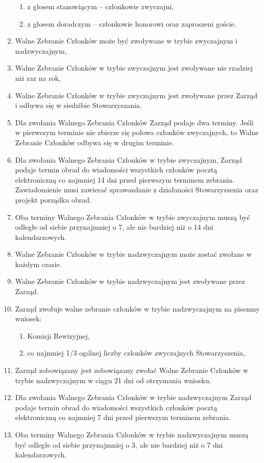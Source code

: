 \documentclass{article}
\begin{document}
\begin{enumerate}
\begin{enumerate}
	            \item z głosem stanowiącym – członkowie zwyczajni,
	            \item z głosem doradczym – członkowie honorowi oraz zaproszeni goście.
	          \end{enumerate}
	        \item Walne Zebranie Członków może być zwoływane w trybie zwyczajnym i nadzwyczajnym,
	        \item Walne Zebranie Członków w trybie zwyczajnym jest zwoływane nie rzadziej niż raz na rok,
	        \item Walne Zebranie Członków w trybie zwyczajnym jest zwoływane przez Zarząd i odbywa się w siedzibie Stowarzyszania.
	    \item Dla zwołania Walnego Zebrania Członków Zarząd podaje dwa terminy. Jeśli w pierwszym terminie nie zbierze się połowa członków zwyczajnych, to Walne Zebranie Członków odbywa się w drugim terminie.
	    \item Dla zwołania Walnego Zebrania Członków w trybie zwyczajnym, Zarząd podaje termin obrad do wiadomości wszystkich członków pocztą elektroniczną co najmniej 14 dni przed pierwszym terminem zebrania. Zawiadomienie musi zawierać sprawozdanie z działaności Stowarzyszenia oraz projekt porządku obrad.
	    \item Oba terminy Walnego Zebrania Członków w trybie zwyczajnym muszą być odległe od siebie przynajmniej o 7, ale nie bardziej niż o 14 dni kalendarzowych.
	    \item Walne Zebranie Członków w trybie nadzwyczajnym może zostać zwołane w każdym czasie.
	    \item Walne Zebranie Członków w trybie nadzwyczajnym jest zwoływane przez Zarząd.
	    \item Zarząd zwołuje walne zebranie członków w trybie nadzwyczajnym na pisemny wniosek:
	      \begin{enumerate}
	        \item Komisji Rewizyjnej,
	        \item co najmniej 1/3 ogólnej liczby członków zwyczajnych Stowarzyszenia,
	        \end{enumerate}
	    \item Zarząd zobowiązany jest zobowiązany zwołać Walne Zebranie Członków w trybie nadzwyczajnym w ciągu 21 dni od otrzymania wniosku.
	    \item  Dla zwołania Walnego Zebrania Członków w trybie nadzwyczajnym Zarząd podaje termin obrad do wiadomości wszystkich członków pocztą elektroniczną co najmniej 7 dni przed pierwszym terminem zebrania. 
	    \item Oba terminy Walnego Zebrania Członków w trybie nadzwyczajnym muszą być odległe od siebie przynajmniej o 3, ale nie bardziej niż o 7 dni kalendarzowych.

\end{enumerate}
\end{document}
